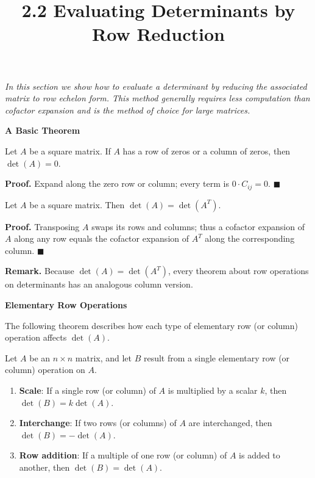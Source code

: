 \documentclass{article}
\title{2.2 Evaluating Determinants by Row Reduction}
\date{}
\author{}
\newcommand{\redheading}[1]{{\vspace{2mm}\noindent\Large\bfseries\color{red!55!black} #1\par}\vspace{2mm}}
\theoremstyle{mystyle}
\begin{document}
\maketitle

{\itshape\color{blue!45!black}
In this section we show how to evaluate a determinant by reducing the associated matrix to row echelon form. This method generally requires less computation than cofactor expansion and is the method of choice for large matrices.\par}

\vspace{2mm}

\redheading{A Basic Theorem}

\begin{tcolorbox}[colback=red!4, colframe=red!60!black,
  title={\textbf{Theorem 2.2.1}}, boxrule=0.5mm, arc=3mm]
Let $A$ be a square matrix. If $A$ has a row of zeros or a column of zeros, then $\det(A)=0$.
\end{tcolorbox}

\textbf{Proof.} Expand along the zero row or column; every term is $0\cdot C_{ij}=0$. $\blacksquare$

\begin{tcolorbox}[colback=red!4, colframe=red!60!black,
  title={\textbf{Theorem 2.2.2}}, boxrule=0.5mm, arc=3mm]
Let $A$ be a square matrix. Then $\det(A)=\det(A^T)$.
\end{tcolorbox}

\textbf{Proof.} Transposing $A$ swaps its rows and columns; thus a cofactor expansion of $A$ along any row equals the cofactor expansion of $A^T$ along the corresponding column. $\blacksquare$

\textbf{Remark.} Because $\det(A)=\det(A^T)$, every theorem about row operations on determinants has an analogous column version.

\redheading{Elementary Row Operations}

The following theorem describes how each type of elementary row (or column) operation affects $\det(A)$.

\begin{tcolorbox}[colback=red!4, colframe=red!60!black,
  title={\textbf{Theorem 2.2.3}}, boxrule=0.5mm, arc=3mm]
Let $A$ be an $n\times n$ matrix, and let $B$ result from a single elementary row (or column) operation on $A$.
\begin{enumerate}
  \item[(a)] \textbf{Scale}: If a single row (or column) of $A$ is multiplied by a scalar $k$, then $\det(B)=k\det(A)$.
  \item[(b)] \textbf{Interchange}: If two rows (or columns) of $A$ are interchanged, then $\det(B)=-\det(A)$.
  \item[(c)] \textbf{Row addition}: If a multiple of one row (or column) of $A$ is added to another, then $\det(B)=\det(A)$.
\end{enumerate}
\end{tcolorbox}
\end{document}
